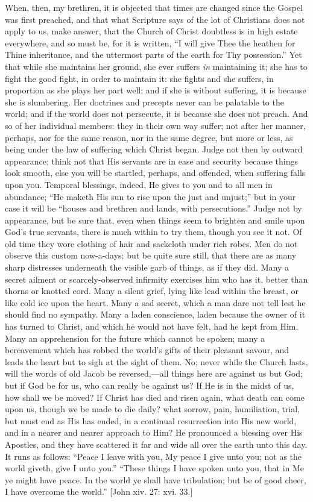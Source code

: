 When, then, my brethren, it is objected that times are changed
since the Gospel was first preached, and that what Scripture says of
the lot of Christians does not apply to us, make answer, that the
Church of Christ doubtless is in high estate everywhere, and so must
be, for it is written, ``I will give Thee the heathen for Thine
inheritance, and the uttermost parts of the earth for Thy
possession.'' Yet that while she maintains her ground, she ever
suffers \emph{in} maintaining it; she has to fight the good fight, in
order to maintain it: she fights and she suffers, in proportion as she
plays her part well; and if she is without suffering, it is because
she is slumbering. Her doctrines and precepts never can be palatable
to the world; and if the world does not persecute, it is because she
does not preach. And so of her individual members: they in their own
way suffer; not after her manner, perhaps, nor for the same reason,
nor in the same degree, but more or less, as being under the law of
suffering which Christ began. Judge not then by outward appearance;
think not that His servants are in ease and security because things
look smooth, else you will be startled, perhaps, and offended, when
suffering falls upon you. Temporal blessings, indeed, He gives to you
and to all men in abundance; ``He maketh His sun to rise upon the
just and unjust;'' but in your case it will be ``houses and
brethren and lands, with persecutions.'' Judge not by appearance,
but be sure that, even when things seem to brighten and smile upon
God's true servants, there is much within to try them, though you see
it not. Of old time they wore clothing of hair and sackcloth under
rich robes. Men do not observe this custom now-a-days; but be quite
sure still, that there are as many sharp distresses underneath the
visible garb of things, as if they did. Many a secret ailment or
scarcely-observed infirmity exercises him who has it, better than
thorns or knotted cord. Many a silent grief, lying like lead within
the breast, or like cold ice upon the heart. Many a sad secret, which
a man dare not tell lest he should find no sympathy. Many a laden
conscience, laden because the owner of it has turned to Christ, and
which he would not have felt, had he kept from Him. Many an
apprehension for the future which cannot be spoken; many a bereavement
which has robbed the world's gifts of their pleasant savour, and leads
the heart but to sigh at the sight of them. No; never while the Church
lasts, will the words of old Jacob be reversed,—all things here are
against us but God; but if God be for us, who can really be against
us? If He is in the midst of us, how shall we be moved? If Christ has
died and risen again, what death can come upon us, though we be made
to die daily? what sorrow, pain, humiliation, trial, but must end as
His has ended, in a continual resurrection into His new world, and in
a nearer and nearer approach to Him? He pronounced a blessing over His
Apostles, and they have scattered it far and wide all over the earth
unto this day. It runs as follows: ``Peace I leave with you, My
peace I give unto you; not as the world giveth, give I unto you.''
``These things I have spoken unto you, that in Me ye might have
peace. In the world ye shall have tribulation; but be of good cheer, I
have overcome the world.'' [John xiv. 27: xvi. 33.]

